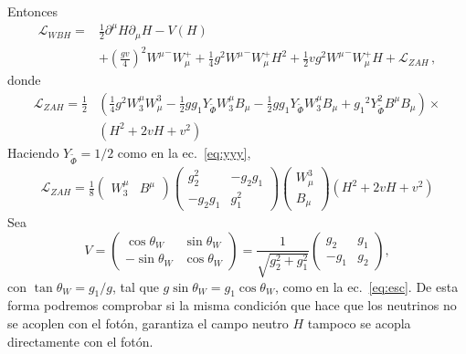\begin{frame}

Entonces
\begin{align}
  \label{eq:96qft}
  \mathcal{L}_{WBH}=&\frac{1}{2}\partial^\mu H\partial_\mu H-V(H)\nonumber\\
  &+\left(\frac{gv}{4}\right)^2{W^\mu}^-W_\mu^++\frac{1}{4}g^2{W^\mu}^-W_\mu^+H^2+\frac{1}{2}vg^2{W^\mu}^-W_\mu^+H+\mathcal{L}_{Z A H}\,,
\end{align}
donde
\begin{align}
  \mathcal{L}_{ZAH}=\frac{1}{2}&\left(\tfrac{1}{4}g^2W_3^\mu W^3_\mu-\tfrac{1}{2}g{g_1}Y_{\widetilde{\Phi}} W_3^\mu B_\mu-\tfrac{1}{2}g{g_1}Y_{\widetilde{\Phi}} W_3^\mu B_\mu+{{g_1}}^2Y_{\widetilde{\Phi}} ^2B^\mu B_\mu\right)\times\nonumber\\
&\left(H^2+2vH+v^2\right)
\end{align}
Haciendo $Y_{\widetilde{\Phi}} =1/2$ como en la ec.~\eqref{eq:yyy},
\begin{align}
  \mathcal{L}_{ZAH}=\frac{1}{8}
  \begin{pmatrix}
    W^\mu_3 & B^\mu
  \end{pmatrix}
  \begin{pmatrix}
    g^2_2&-g_2{g_1}\\
    -g_2{g_1}&g_1^2
  \end{pmatrix}
  \begin{pmatrix}
    W^3_\mu\\
    B_\mu
  \end{pmatrix}
\left(H^2+2vH+v^2\right)
\end{align}
Sea
\begin{equation}
  V=\begin{pmatrix}
    \cos\theta_W & \sin\theta_W\\
    -\sin\theta_W& \cos\theta_W
  \end{pmatrix}=
  \frac{1}{\sqrt{g^2_2+g_1^2}}\begin{pmatrix}
    g_2   & {g_1}\\
    -{g_1} & g_2
  \end{pmatrix},
\end{equation}
con $\tan\theta_W={g_1}/g$, tal que $g\sin\theta_W={g_1}\cos\theta_W$, como en la ec.~\eqref{eq:esc}. De esta forma podremos comprobar si la misma condición que hace que los neutrinos no se acoplen con el fotón, garantiza el campo neutro $H$ tampoco se acopla directamente con el fotón. 


\end{frame}
